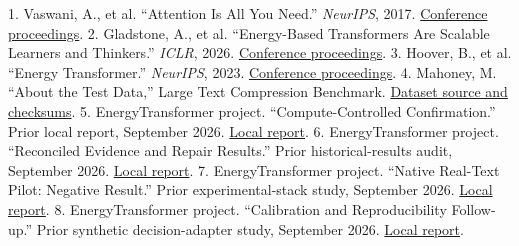 \documentclass[11pt,letterpaper]{article}
\begin{document}
1. Vaswani, A., et al. “Attention Is All You Need.” \emph{NeurIPS}, 2017. \href{https://proceedings.neurips.cc/paper/2017/hash/3f5ee243547dee91fbd053c1c4a845aa-Abstract.html}{Conference proceedings}.
2. Gladstone, A., et al. “Energy-Based Transformers Are Scalable Learners and Thinkers.” \emph{ICLR}, 2026. \href{https://proceedings.iclr.cc/paper_files/paper/2026/hash/e19a65fd53b6f9a88b354da98813465d-Abstract-Conference.html}{Conference proceedings}.
3. Hoover, B., et al. “Energy Transformer.” \emph{NeurIPS}, 2023. \href{https://proceedings.neurips.cc/paper_files/paper/2023/hash/57a9b97477b67936298489e3c1417b0a-Abstract-Conference.html}{Conference proceedings}.
4. Mahoney, M. “About the Test Data,” Large Text Compression Benchmark. \href{https://mattmahoney.net/dc/textdata.html}{Dataset source and checksums}.
5. EnergyTransformer project. “Compute-Controlled Confirmation.” Prior local report, September 2026. \href{../reports/compute_confirmation/REPORT.md}{Local report}.
6. EnergyTransformer project. “Reconciled Evidence and Repair Results.” Prior historical-results audit, September 2026. \href{../FINDINGS.md}{Local report}.
7. EnergyTransformer project. “Native Real-Text Pilot: Negative Result.” Prior experimental-stack study, September 2026. \href{../../EnergyTransformer-diffusion-state/reports/experimental\_stack/real\_text\_pilot\_001/REPORT.md}{Local report}.
8. EnergyTransformer project. “Calibration and Reproducibility Follow-up.” Prior synthetic decision-adapter study, September 2026. \href{../../EnergyTransformer-diffusion-state/reports/sentinel\_reasoning/POLISH.md}{Local report}.
\end{document}
